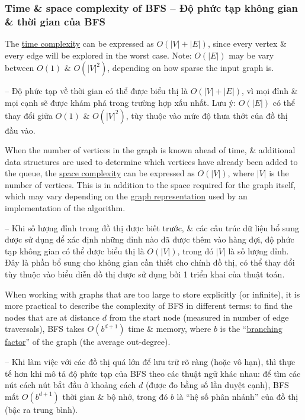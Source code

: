 \documentclass[oneside]{book}
\begin{document}

\subsubsection{Time \& space complexity of BFS -- Độ phức tạp không gian \& thời gian của BFS}
The \href{https://en.wikipedia.org/wiki/Time_complexity}{time complexity} can be expressed as $O(|V| + |E|)$, since every vertex \& every edge will be explored in the worst case. Note: $O(|E|)$ may be vary between $O(1)$ \& $O(|V|^2)$, depending on how sparse the input graph is.

-- Độ phức tạp về thời gian có thể được biểu thị là $O(|V| + |E|)$, vì mọi đỉnh \& mọi cạnh sẽ được khám phá trong trường hợp xấu nhất. Lưu ý: $O(|E|)$ có thể thay đổi giữa $O(1)$ \& $O(|V|^2)$, tùy thuộc vào mức độ thưa thớt của đồ thị đầu vào.

When the number of vertices in the graph is known ahead of time, \& additional data structures are used to determine which vertices have already been added to the queue, the \href{https://en.wikipedia.org/wiki/Space_complexity}{space complexity} can be expressed as $O(|V|)$, where $|V|$ is the number of vertices. This is in addition to the space required for the graph itself, which may vary depending on the \href{https://en.wikipedia.org/wiki/Graph_(abstract_data_type)}{graph representation} used by an implementation of the algorithm.

-- Khi số lượng đỉnh trong đồ thị được biết trước, \& các cấu trúc dữ liệu bổ sung được sử dụng để xác định những đỉnh nào đã được thêm vào hàng đợi, độ phức tạp không gian có thể được biểu thị là $O(|V|)$, trong đó $|V|$ là số lượng đỉnh. Đây là phần bổ sung cho không gian cần thiết cho chính đồ thị, có thể thay đổi tùy thuộc vào biểu diễn đồ thị được sử dụng bởi 1 triển khai của thuật toán.

When working with graphs that are too large to store explicitly (or infinite), it is more practical to describe the complexity of BFS in different terms: to find the nodes that are at distance $d$ from the start node (measured in number of edge traversals), BFS takes $O(b^{d+1})$ time \& memory, where $b$ is the ``\href{https://en.wikipedia.org/wiki/Branching_factor}{branching factor}'' of the graph (the average out-degree).

-- Khi làm việc với các đồ thị quá lớn để lưu trữ rõ ràng (hoặc vô hạn), thì thực tế hơn khi mô tả độ phức tạp của BFS theo các thuật ngữ khác nhau: để tìm các nút cách nút bắt đầu ở khoảng cách $d$ (được đo bằng số lần duyệt cạnh), BFS mất $O(b^{d+1})$ thời gian \& bộ nhớ, trong đó $b$ là ``hệ số phân nhánh'' của đồ thị (bậc ra trung bình).
\end{document}
